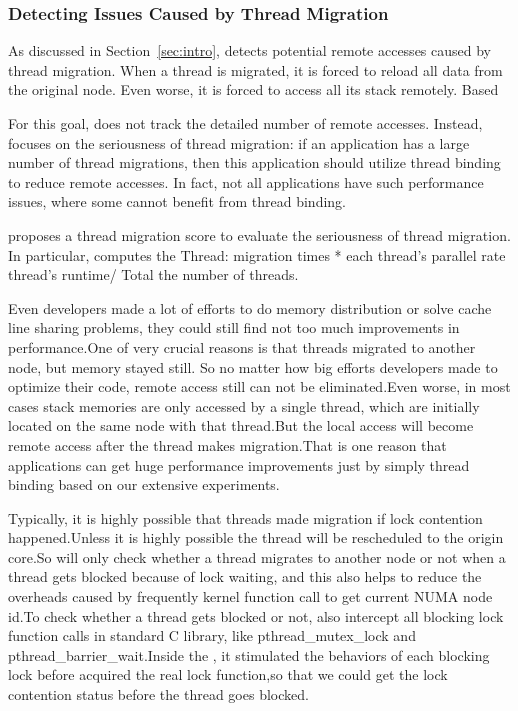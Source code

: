 
\subsubsection{Detecting Issues Caused by Thread Migration}

As discussed in Section~\ref{sec:intro}, \NP{} detects potential remote accesses caused by thread migration. When a thread is migrated, it is forced to reload all data from the original node. Even worse, it is forced to access all its stack remotely. Based 

For this goal, \NP{} does not track the detailed number of remote accesses. Instead, \NP{} focuses on the seriousness of thread migration: if an application has a large number of thread migrations,  then this application should utilize thread binding to reduce remote accesses. In fact, not all applications have such performance issues, where some cannot benefit from thread binding. 

\NP{} proposes a thread migration score to evaluate the seriousness of thread migration. In particular, \NP{} computes the 
Thread: migration times * each thread's parallel rate 
thread's runtime/ 
Total the number of threads. 

Even developers made a lot of efforts to do memory distribution or solve cache line sharing problems, they could still find not too much improvements in performance.One of very crucial reasons is that threads migrated to another node, but memory stayed still. So no matter how big efforts developers made to optimize their code, remote access still can not be eliminated.Even worse, in most cases stack memories are only accessed by a single thread, which are initially located on the same node with that thread.But the local access will become remote access after the thread makes migration.That is one reason that applications can get huge performance improvements just by simply thread binding based on our extensive experiments.

Typically, it is highly possible that threads made migration if lock contention happened.Unless it is highly possible the thread will be rescheduled to the origin core.So \NP{} will only check whether a thread migrates to another node or not when a thread gets blocked because of lock waiting, and this also helps to reduce the overheads caused by frequently kernel function call to get current NUMA node id.To check whether a thread gets blocked or not, \NP{} also intercept all blocking lock function calls in standard C library, like pthread\_mutex\_lock and pthread\_barrier\_wait.Inside the \NP{}, it stimulated the behaviors of each blocking lock before acquired the real lock function,so that we could get the lock contention status before the thread goes blocked.

